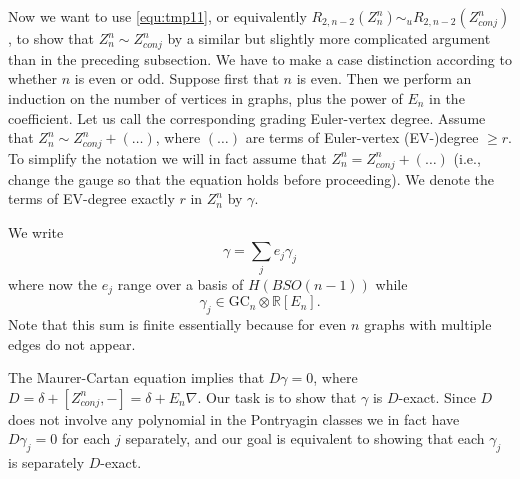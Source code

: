 \documentclass[a4paper]{amsart}
\theoremstyle{plain}
\theoremstyle{definition}
\newcommand{\R}{{\mathbb{R}}}
\newcommand{\GC}{\mathrm{GC}}
\newcommand{\SO}{\mathit{SO}}
\begin{document}
Now we want to use \eqref{equ:tmp11}, or equivalently $R_{2,n-2}(Z_{n}^n) \sim_{u}  R_{2,n-2}(Z_{conj}^n)$, to show that $Z_{n}^n \sim  Z_{conj}^n$ by a similar but slightly more complicated argument than in the preceding subsection.
We have to make a case distinction according to whether $n$ is even or odd.
Suppose first that $n$ is even.
Then we perform an induction on the number of vertices in graphs, plus the power of $E_n$ in the coefficient.
Let us call the corresponding grading Euler-vertex degree.
 Assume that $Z_{n}^n \sim Z_{conj}^n + (\dots)$, where $(\dots)$ are terms of Euler-vertex (EV-)degree $\geq r$.
To simplify the notation we will in fact assume that $Z_{n}^n = Z_{conj}^n + (\dots)$ (i.e., change the gauge so that the equation holds before proceeding).
We denote the terms of EV-degree exactly $r$ in $Z_{n}^n$ by $\gamma$.

We write 
\[
\gamma =\sum_j e_j \gamma_j
\]
where now the $e_j$ range over a basis of $H(B\SO(n-1))$ while 
\[
\gamma_j\in \GC_n \otimes \R[E_{n}].
\]
Note that this sum is finite essentially because for even $n$ graphs with multiple edges do not appear. 

The Maurer-Cartan equation implies that $D\gamma=0$, where $D=\delta+[Z_{conj}^n,-]=\delta+E_n\nabla$.
Our task is to show that $\gamma$ is $D$-exact. Since $D$ does not involve any polynomial in the Pontryagin classes we in fact have $D\gamma_j=0$ for each $j$ separately, and our goal is equivalent to showing that each $\gamma_j$ is separately $D$-exact.
\end{document}
